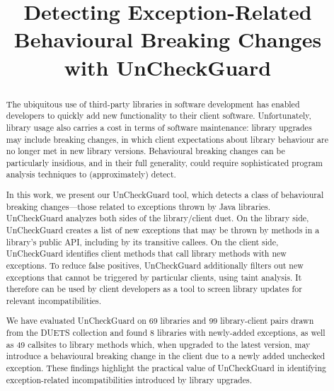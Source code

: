 \documentclass[conference]{IEEEtran}
\begin{document}
	\title {Detecting Exception-Related Behavioural Breaking Changes with UnCheckGuard}

    \author{
    }

    \maketitle
    \thispagestyle{plain}
    \pagestyle{plain}

    \begin{abstract}
      The ubiquitous use of third-party libraries in software development has enabled developers to quickly add
      new functionality to their client software. Unfortunately, library usage also carries a cost in
      terms of software maintenance: library upgrades may include breaking changes, in which client expectations
      about library behaviour are no longer met in new library versions. Behavioural breaking
      changes can be particularly insidious, and in their full generality, could require sophisticated program
      analysis techniques to (approximately) detect.

      In this work, we present our UnCheckGuard tool, which detects a class of behavioural breaking changes---those
      related to exceptions thrown by Java libraries. UnCheckGuard analyzes both sides of the library/client
      duet. On the library side, UnCheckGuard creates a list of new exceptions that may be thrown by methods
      in a library's public API, including by its transitive callees. On the client side, UnCheckGuard identifies
      client methods that call library methods with new exceptions. To reduce false positives, UnCheckGuard
      additionally filters out new exceptions that cannot be triggered by particular clients, using taint analysis. It therefore can be
      used by client developers as a tool to screen library updates for relevant incompatibilities.

      We have evaluated UnCheckGuard on 69 libraries and 99 library-client pairs drawn from the DUETS collection
      and found 8 libraries with newly-added exceptions, as well as 49 callsites to library methods which,
      when upgraded to the latest version, may introduce
      a behavioural breaking change in the client due to a newly added unchecked exception. These findings
      highlight the practical value of UnCheckGuard in identifying exception-related incompatibilities
      introduced by library upgrades.


    \end{abstract}
    
\end{document}
